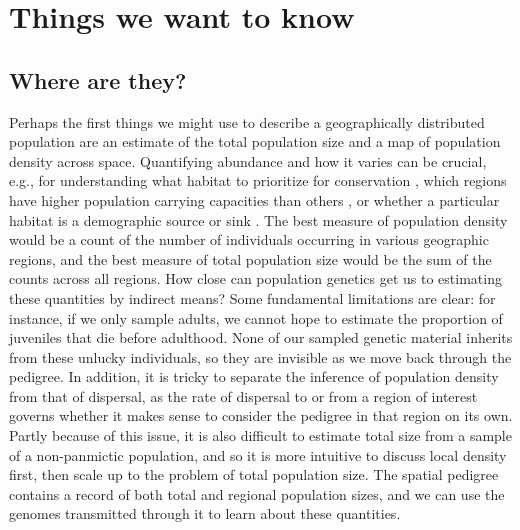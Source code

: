 \documentclass{ar-1col}
\begin{document}
\section{Things we want to know}

\subsection{Where are they?}


Perhaps the first things we might use
to describe a geographically distributed population
are an estimate of the total population size
and a map of population density across space.
Quantifying abundance and how it varies
can be crucial, e.g., for understanding
what habitat to prioritize for conservation \citep{zipkin2018synthesizing}, 
which regions have higher population carrying capacities than others \citep{roughgarden1974}, 
or whether a particular habitat is a demographic source or sink 
\citep{pulliam1988sources}.
The best measure of population density
would be a count of the number of individuals occurring in various geographic regions, 
and the best measure of total population size would be the sum of the counts across all regions.
How close can population genetics get us to estimating these quantities by indirect means?
Some fundamental limitations are clear:
for instance, if we only sample adults,
we cannot hope to estimate the proportion of juveniles that die before adulthood.
None of our sampled genetic material inherits from these unlucky individuals,
so they are invisible as we move back through the pedigree.
In addition, it is tricky to separate the inference of population density 
from that of dispersal, 
as the rate of dispersal to or from a region of interest 
governs whether it makes sense to consider the pedigree in that region on its own.
Partly because of this issue, 
it is also difficult to estimate total size from a sample of a 
non-panmictic population, 
and so it is more intuitive to discuss local density first, 
then scale up to the problem of total population size.
The spatial pedigree contains a record of both total and regional population sizes, 
and we can use the genomes transmitted through it to learn about these quantities.
\end{document}
